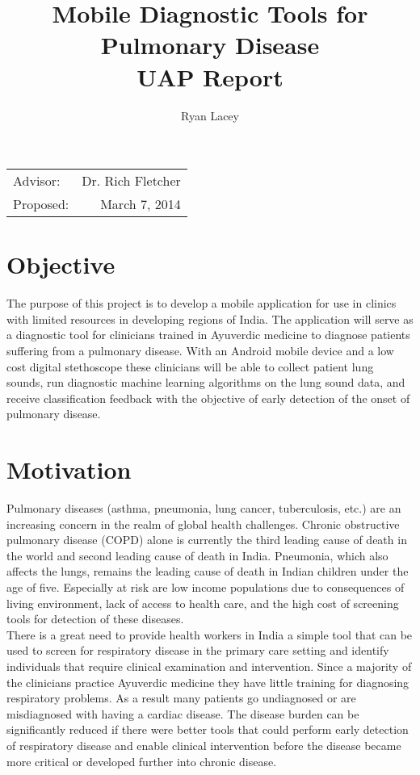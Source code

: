\documentclass{article}
\title{Mobile Diagnostic Tools for Pulmonary Disease\\ UAP Report} %
\author{Ryan Lacey}
\date{}
\begin{document}
\maketitle %

\begin{center}
\begin{tabular}{l r}
Advisor: & Dr. Rich Fletcher \\
Proposed: & March 7, 2014 \\
\end{tabular}
\end{center}

\section{Objective}

The purpose of this project is to develop a mobile application for use in clinics with limited resources in developing regions of India. The application will serve as a diagnostic tool for clinicians trained in Ayuverdic medicine to diagnose patients suffering from a pulmonary disease. With an Android mobile device and a low cost digital stethoscope these clinicians will be able to collect patient lung sounds, run diagnostic machine learning algorithms on the lung sound data, and receive classification feedback with the objective of early detection of the onset of pulmonary disease.\\

\section{Motivation}

Pulmonary diseases (asthma, pneumonia, lung cancer, tuberculosis, etc.) are an increasing concern in the realm of global health challenges. Chronic obstructive pulmonary disease (COPD) alone is currently the third leading cause of death in the world and second leading cause of death in India. Pneumonia, which also affects the lungs, remains the leading cause of death in Indian children under the age of five. Especially at risk are low income populations due to consequences of living environment, lack of access to health care, and the high cost of screening tools for detection of these diseases.\\

There is a great need to provide health workers in India a simple tool that can be used to screen for respiratory disease in the primary care setting and identify individuals that require clinical examination and intervention. Since a majority of the clinicians practice Ayuverdic medicine they have little training for diagnosing respiratory problems. As a result many patients go undiagnosed or are misdiagnosed with having a cardiac disease. The disease burden can be significantly reduced if there were better tools that could perform early detection of respiratory disease and enable clinical intervention before the disease became more critical or developed further into chronic disease.\\
\end{document}
